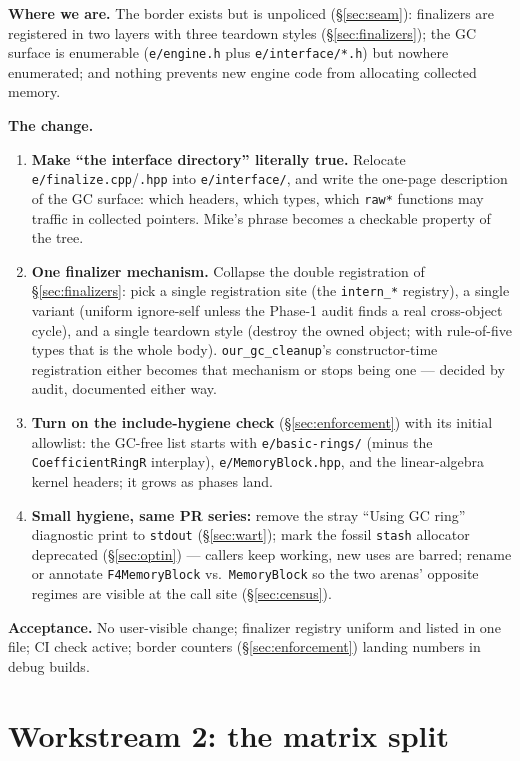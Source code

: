 \documentclass[11pt,oneside]{report}
\newcommand{\code}[1]{\textcolor{m2code}{\texttt{#1}}}
\newcommand{\file}[1]{\textcolor{m2file}{\texttt{#1}}}
\begin{document}
\textbf{Where we are.} The border exists but is unpoliced
(\S\ref{sec:seam}): finalizers are registered in two layers with three
teardown styles (\S\ref{sec:finalizers}); the GC surface is enumerable
(\file{e/engine.h} plus \file{e/interface/*.h}) but nowhere enumerated; and
nothing prevents new engine code from allocating collected memory.

\textbf{The change.}
\begin{enumerate}
\item \textbf{Make ``the interface directory'' literally true.} Relocate
  \file{e/finalize.cpp}/\file{.hpp} into \file{e/interface/}, and write the
  one-page description of the GC surface: which headers, which types, which
  \code{raw*} functions may traffic in collected pointers. Mike's phrase
  becomes a checkable property of the tree.
\item \textbf{One finalizer mechanism.} Collapse the double registration of
  \S\ref{sec:finalizers}: pick a single registration site (the
  \code{intern\_*} registry), a single variant (uniform ignore-self unless
  the Phase-1 audit finds a real cross-object cycle), and a single teardown
  style (destroy the owned object; with rule-of-five types that is the
  whole body). \code{our\_gc\_cleanup}'s constructor-time registration
  either becomes that mechanism or stops being one --- decided by audit,
  documented either way.
\item \textbf{Turn on the include-hygiene check}
  (\S\ref{sec:enforcement}) with its initial allowlist: the GC-free list
  starts with \file{e/basic-rings/} (minus the \code{CoefficientRingR}
  interplay), \file{e/MemoryBlock.hpp}, and the linear-algebra kernel
  headers; it grows as phases land.
\item \textbf{Small hygiene, same PR series:} remove the stray
  ``Using GC ring'' diagnostic print to \code{stdout}
  (\S\ref{sec:wart}); mark the fossil \code{stash} allocator deprecated
  (\S\ref{sec:optin}) --- callers keep working, new uses are barred; rename
  or annotate \code{F4MemoryBlock} vs.\ \code{MemoryBlock} so the two
  arenas' opposite regimes are visible at the call site
  (\S\ref{sec:census}).
\end{enumerate}

\textbf{Acceptance.} No user-visible change; finalizer registry uniform and
listed in one file; CI check active; border counters
(\S\ref{sec:enforcement}) landing numbers in debug builds.

\section{Workstream 2: the matrix split}
\label{sec:ws-matrix}
\end{document}
